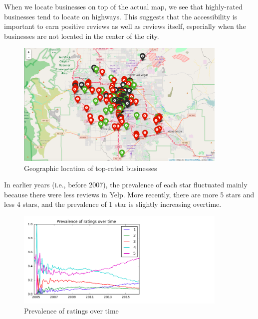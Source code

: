 \documentclass[11pt]{article}
\begin{document}
\par When we locate businesses on top of the actual map, we see that highly-rated businesses tend to locate on highways. This suggests that the accessibility is important to earn positive reviews as well as reviews itself, especially when the businesses are not located in the center of the city.
\begin{figure}[H]
\centering
\includegraphics[width=0.9\textwidth]{./ac209/mostreviewsbylocationlv.png}
\caption{Geographic location of top-rated businesses}
\end{figure}


\par In earlier years (i.e., before 2007), the prevalence of each star fluctuated mainly because there were less reviews in Yelp. More recently, there are more 5 stars and less 4 stars, and the prevalence of 1 star is slightly increasing overtime.
\begin{figure}[H]
\centering
\includegraphics[width=0.9\textwidth]{./ac209/prevalenceofratingsovertime.png}
\caption{Prevalence of ratings over time}
\end{figure}
\end{document}

